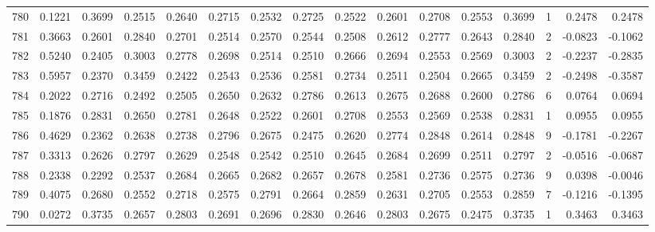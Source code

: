 \begin{tabular}{lrrrrrrrrrrrrrrr}
780 &      0.1221 &  0.3699 &  0.2515 &  0.2640 &  0.2715 &  0.2532 &  0.2725 &  0.2522 &  0.2601 &  0.2708 &   0.2553 &     0.3699 &      1 &                    0.2478 &                     0.2478 \\
781 &      0.3663 &  0.2601 &  0.2840 &  0.2701 &  0.2514 &  0.2570 &  0.2544 &  0.2508 &  0.2612 &  0.2777 &   0.2643 &     0.2840 &      2 &                   -0.0823 &                    -0.1062 \\
782 &      0.5240 &  0.2405 &  0.3003 &  0.2778 &  0.2698 &  0.2514 &  0.2510 &  0.2666 &  0.2694 &  0.2553 &   0.2569 &     0.3003 &      2 &                   -0.2237 &                    -0.2835 \\
783 &      0.5957 &  0.2370 &  0.3459 &  0.2422 &  0.2543 &  0.2536 &  0.2581 &  0.2734 &  0.2511 &  0.2504 &   0.2665 &     0.3459 &      2 &                   -0.2498 &                    -0.3587 \\
784 &      0.2022 &  0.2716 &  0.2492 &  0.2505 &  0.2650 &  0.2632 &  0.2786 &  0.2613 &  0.2675 &  0.2688 &   0.2600 &     0.2786 &      6 &                    0.0764 &                     0.0694 \\
785 &      0.1876 &  0.2831 &  0.2650 &  0.2781 &  0.2648 &  0.2522 &  0.2601 &  0.2708 &  0.2553 &  0.2569 &   0.2538 &     0.2831 &      1 &                    0.0955 &                     0.0955 \\
786 &      0.4629 &  0.2362 &  0.2638 &  0.2738 &  0.2796 &  0.2675 &  0.2475 &  0.2620 &  0.2774 &  0.2848 &   0.2614 &     0.2848 &      9 &                   -0.1781 &                    -0.2267 \\
787 &      0.3313 &  0.2626 &  0.2797 &  0.2629 &  0.2548 &  0.2542 &  0.2510 &  0.2645 &  0.2684 &  0.2699 &   0.2511 &     0.2797 &      2 &                   -0.0516 &                    -0.0687 \\
788 &      0.2338 &  0.2292 &  0.2537 &  0.2684 &  0.2665 &  0.2682 &  0.2657 &  0.2678 &  0.2581 &  0.2736 &   0.2575 &     0.2736 &      9 &                    0.0398 &                    -0.0046 \\
789 &      0.4075 &  0.2680 &  0.2552 &  0.2718 &  0.2575 &  0.2791 &  0.2664 &  0.2859 &  0.2631 &  0.2705 &   0.2553 &     0.2859 &      7 &                   -0.1216 &                    -0.1395 \\
790 &      0.0272 &  0.3735 &  0.2657 &  0.2803 &  0.2691 &  0.2696 &  0.2830 &  0.2646 &  0.2803 &  0.2675 &   0.2475 &     0.3735 &      1 &                    0.3463 &                     0.3463 \\

\end{tabular}
